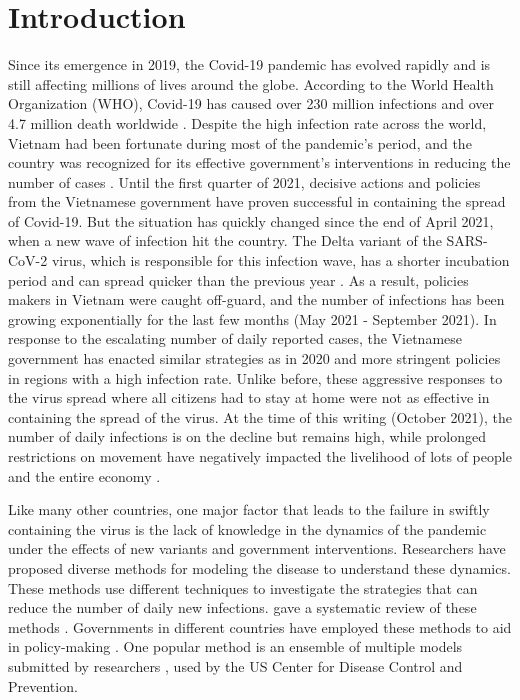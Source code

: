 \chapter{Introduction}

Since its emergence in 2019, the Covid-19 pandemic has evolved rapidly and is still affecting millions of lives around the globe.
According to the World Health Organization (WHO), Covid-19 has caused over 230 million infections and over 4.7 million death worldwide \cite{WHOCoronavirusCOVID19}.
Despite the high infection rate across the world, Vietnam had been fortunate during most of the pandemic's period, and the country was recognized for its effective government's interventions in reducing the number of cases \cite{EmergingCOVID19Success,haCombatingCOVID19Epidemic2020}.
Until the first quarter of 2021, decisive actions and policies from the Vietnamese government have proven successful in containing the spread of Covid-19.
But the situation has quickly changed since the end of April 2021, when a new wave of infection hit the country.
The Delta variant of the SARS-CoV-2 virus, which is responsible for this infection wave, has a shorter incubation period and can spread quicker than the previous year \cite{VietnamNewCOVID,mahaseDeltaVariantWhat2021}.
As a result, policies makers in Vietnam were caught off-guard, and the number of infections has been growing exponentially for the last few months (May 2021 - September 2021).
In response to the escalating number of daily reported cases, the Vietnamese government has enacted similar strategies as in 2020 and more stringent policies in regions with a high infection rate.
Unlike before, these aggressive responses to the virus spread where all citizens had to stay at home were not as effective in containing the spread of the virus.
At the time of this writing (October 2021), the number of daily infections is on the decline but remains high, while prolonged restrictions on movement have negatively impacted the livelihood of lots of people and the entire economy \cite{RapidAssessmentDesign, VietnamPoisedMiss}.

Like many other countries, one major factor that leads to the failure in swiftly containing the virus is the lack of knowledge in the dynamics of the pandemic under the effects of new variants and government interventions.
Researchers have proposed diverse methods for modeling the disease to understand these dynamics.
These methods use different techniques to investigate the strategies that can reduce the number of daily new infections.
\citeauthor{rahimiReviewCOVID19Forecasting2021} gave a systematic review of these methods \cite{rahimiReviewCOVID19Forecasting2021}.
Governments in different countries have employed these methods to aid in policy-making \cite{adamSpecialReportSimulations2020}.
One popular method is an ensemble of multiple models submitted by researchers \cite{rayEnsembleForecastsCoronavirus2020}, used by the \gls{US} Center for Disease Control and Prevention.


